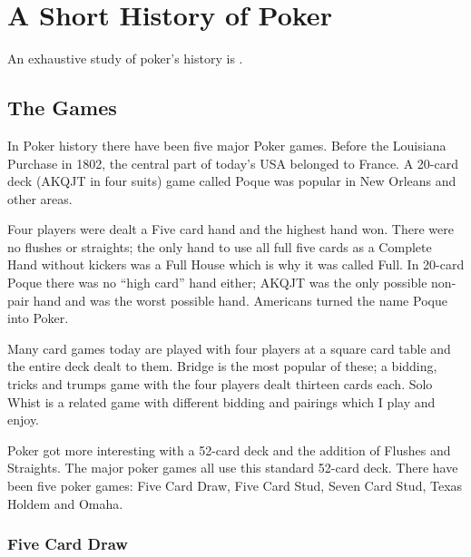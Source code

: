 \chapter{A Short History of Poker}

An exhaustive study of poker's history is \citet{McManus}.

\section{The Games}

In Poker history there have been five major Poker games.
Before the Louisiana Purchase in 1802, the central part of today's USA
belonged to France. A 20-card deck (AKQJT in four suits) game called
Poque was popular in New Orleans and other areas.

Four players were dealt a Five card hand and the highest hand won. There
were no flushes or straights; the only hand to use all full five cards
as a Complete Hand without kickers was a Full House which is why it was
called Full. In 20-card Poque there was no ``high card'' hand either;
AKQJT was the only possible non-pair hand and was the worst possible
hand. Americans turned the name Poque into Poker.

Many card games today are played with four players at a square
card table and the entire deck dealt to them. Bridge is the
most popular of these; a bidding, tricks and trumps game with the four
players dealt thirteen cards each. Solo Whist is a related game with
different bidding and pairings which I play and enjoy.

Poker got more interesting with a 52-card deck and the addition of
Flushes and Straights. The major poker games all use this standard
52-card deck. There have been five poker games: Five Card Draw, Five
Card Stud, Seven Card Stud, Texas Holdem and Omaha.



\subsection{Five Card Draw}

